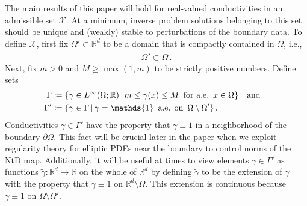 \documentclass[pdflatex,sn-mathphys-num]{sn-jnl-preprint}
\let\originalleft\left %
\let\originalright\right
\renewcommand{\left}{\mathopen{}\mathclose\bgroup\originalleft}
\renewcommand{\right}{\aftergroup\egroup\originalright}
\newcommand{\R}{\mathbb{R}}
\newcommand{\cX}{\mathcal{X}}
\newcommand{\set}[2]{{\left\{ #1 \,\middle|\, #2 \right\}}}
\newcommand{\defeq}{\coloneqq} %
\newcommand{\onebm}{\mathds{1}} %
\def\qa{\quad\text{and}\quad}
\theoremstyle{thmstyleone}%
\theoremstyle{thmstyletwo}%
\theoremstyle{thmstylethree}%
\numberwithin{equation}{section}
\numberwithin{theorem}{section}
\begin{document}
The main results of this paper will hold for real-valued conductivities in an admissible set $\cX$. At a minimum, inverse problem solutions belonging to this set should be unique and (weakly) stable to perturbations of the boundary data. To define $\cX$, first fix $\Omega'\subset\R^d$ to be a domain that is compactly contained in $\Omega$, i.e.,
\begin{align}\label{eqn:compact_support_set}
    \overline{\Omega'}\subset \Omega\,.
\end{align}
Next, fix $m>0$ and $M\geq \max(1, m)$ to be strictly positive numbers. Define sets
\begin{align}\label{eqn:conductivity_set_prelim}
    \begin{split}
        \Gamma &\defeq \set{\gamma\in L^\infty(\Omega;\R)}{m\leq \gamma(x)\leq M \,\ \text{for a.e.} \,\ x\in\Omega}\qa\\
      \Gamma' &\defeq \set{\gamma\in\Gamma}{\gamma = \onebm \,\ \text{a.e. on} \,\ \Omega\setminus\Omega' }
        \,.
    \end{split}
\end{align}
Conductivities $\gamma\in \Gamma'$ have the property that $\gamma\equiv 1$ in a neighborhood of the boundary $\partial\Omega$. This fact will be crucial later in the paper when we exploit regularity theory for elliptic PDEs near the boundary to control norms of the NtD map. Additionally, it will be useful at times to view elements $\gamma\in\Gamma'$ as functions $\widetilde{\gamma}\colon\R^d\to\R$ on the whole of $\R^d$ by defining $\widetilde{\gamma}$ to be the extension of $\gamma$ with the property that $\widetilde{\gamma}\equiv 1$ on $\R^d\setminus\Omega$. This extension is continuous because $\gamma\equiv 1$ on $\Omega\setminus\Omega'$.
\end{document}
